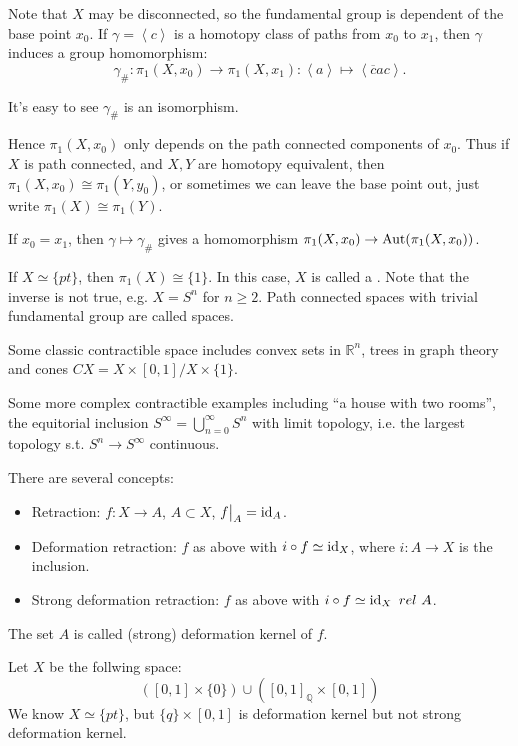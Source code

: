 Note that $X$ may be disconnected, so the fundamental group
is dependent of the base point $x_0$.
If $\gamma = \left<c \right>$ is a homotopy class of paths from $x_0$ to $x_1$,
then $\gamma$ induces a group homomorphism:
\[
\gamma_\# : \pi_1(X, x_0)\to \pi_1(X, x_1):
\left<a \right>\mapsto \left< \overline{c}ac \right>.
\]

It's easy to see $\gamma_\#$ is an isomorphism.

Hence $\pi_1(X, x_0)$ only depends on the path connected components of $x_0$.
Thus if $X$ is path connected, and $X, Y$ are homotopy equivalent,
then $\pi_1(X, x_0)\cong \pi_1(Y, y_0)$, or sometimes we can leave the base
point out, just write $\pi_1(X)\cong \pi_1(Y)$.
\begin{remark}
    If $x_0 = x_1$, then $\gamma\mapsto \gamma_\#$ gives a homomorphism
	$\pi_1(X, x_0)\to \operatorname{Aut}(\pi_1(X,x_0))$.
\end{remark}

\begin{example}
    If $X\simeq \{pt\}$, then $\pi_1(X) \cong \{1\}$.
	In this case, $X$ is called a .
	Note that the inverse is not true, e.g. $X = S^n$ for $n\ge 2$.
	Path connected spaces with trivial fundamental group
	are called  spaces.

	Some classic contractible space includes convex sets in $\mathbb{R}^n$,
	trees in graph theory and cones $CX = X\times [0, 1]/ X\times \{1\}$.
\end{example}

Some more complex contractible examples including ``a house with two rooms'',
the equitorial inclusion $S^\infty = \bigcup_{n=0}^\infty S^n$ with
limit topology, i.e. the largest topology s.t. $S^n\to S^\infty$ continuous.

There are several concepts:
\begin{itemize}
	\item Retraction: $f:X \to A$, $A \subset X$, $f\big|_{A} = \operatorname{id}_A$.
	\item Deformation retraction: $f$ as above with $i\circ f \simeq \operatorname{id}_X$,
		where  $i: A\to X$ is the inclusion.
	\item Strong deformation retraction: $f$ as above with
		$i\circ f \simeq \id_X \ rel\ A$.
\end{itemize}
The set $A$ is called (strong) deformation kernel of $f$.

\begin{example}
    Let $X$ be the follwing space:
	\[
		([0,1]\times \{0\}) \cup ([0, 1]_{\mathbb{Q}} \times [0, 1])
	\]
	We know $X\simeq \{pt\}$,
	but $\{q\}\times [0,1]$ is deformation kernel but not strong deformation kernel.
\end{example}

